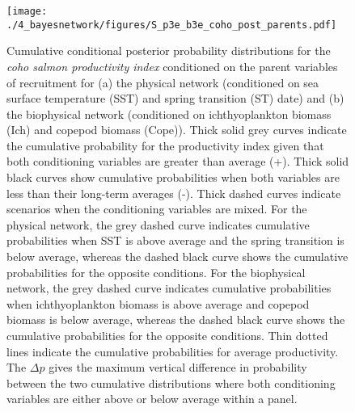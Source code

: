 \begin{figure}[htbp]
  \centering \texttt{[image: ./4\_bayesnetwork/figures/S\_p3e\_b3e\_coho\_post\_parents.pdf]}
  \caption[Cumulative conditional posterior probability distributions for the
    coho salmon productivity index conditioned on the parent variables of
    recruitment.]{Cumulative conditional posterior probability distributions for
    the \emph{coho salmon productivity index} conditioned on the parent
    variables of recruitment for (a) the physical network (conditioned on sea
    surface temperature (SST) and spring transition (ST) date) and (b) the
    biophysical network (conditioned on ichthyoplankton biomass (Ich) and
    copepod biomass (Cope)). Thick solid grey curves indicate the cumulative
    probability for the productivity index given that both conditioning
    variables are greater than average (+). Thick solid black curves show
    cumulative probabilities when both variables are less than their long-term
    averages (-). Thick dashed curves indicate scenarios when the conditioning
    variables are mixed. For the physical network, the grey dashed curve
    indicates cumulative probabilities when SST is above average and the spring
    transition is below average, whereas the dashed black curve shows the
    cumulative probabilities for the opposite conditions. For the biophysical
    network, the grey dashed curve indicates cumulative probabilities when
    ichthyoplankton biomass is above average and copepod biomass is below
    average, whereas the dashed black curve shows the cumulative probabilities
    for the opposite conditions.  Thin dotted lines indicate the cumulative
    probabilities for average productivity. The \(\Delta p\) gives the maximum
    vertical difference in probability between the two cumulative distributions
    where both conditioning variables are either above or below average within a
    panel.} 
  \label{fig:bn:s4}
\end{figure}
